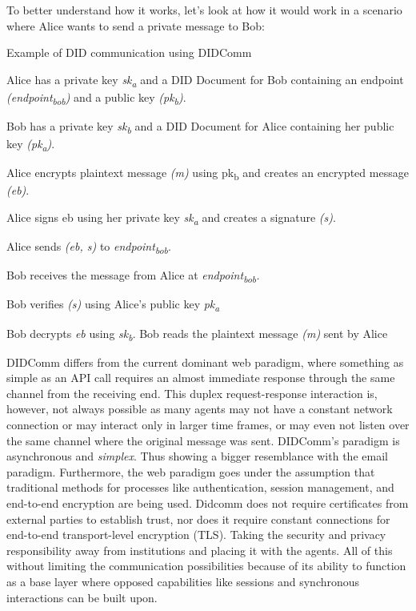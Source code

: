 To better understand how it works, let's look at how it would work in a scenario where Alice wants to send a private message to Bob: 

\begin{algorithm}[H]
\caption{Example of DID communication using DIDComm \cite{Abramson_2020}}
\label{alg:didcomm_example}
  \begin{algorithmic}[1]
    \State Alice has a private key \emph{sk\textsubscript{a}} and a DID Document for Bob containing an endpoint \emph{(endpoint\textsubscript{bob})} and a public key \emph{(pk\textsubscript{b})}.

    \State Bob has a private key \emph{sk\textsubscript{b}} and a DID Document for Alice containing her public key \emph{(pk\textsubscript{a})}.

    \State Alice encrypts plaintext message \emph{(m)} using pk\textsubscript{b} and creates an encrypted message \emph{(eb)}.

    \State Alice signs eb using her private key \emph{sk\textsubscript{a}} and creates a signature \emph{(s)}.

    \State Alice sends \emph{(eb, s)} to \emph{endpoint\textsubscript{bob}}.

    \State Bob receives the message from Alice at \emph{{endpoint\textsubscript{bob}}.}

    \State Bob verifies \emph{(s)} using Alice's public key \emph{pk\textsubscript{a}}

    \State Bob decrypts \emph{eb} using \emph{sk\textsubscript{b}}.
    \State Bob reads the plaintext message \emph{(m)} sent by Alice
    \EndIf
  \end{algorithmic}
\end{algorithm}



DIDComm differs from the current dominant web paradigm, where something as simple as an API call requires an almost immediate response through the same channel from the receiving end. This duplex request-response interaction is, however, not always possible as many agents may not have a constant network connection or may interact only in larger time frames, or may even not listen over the same channel where the original message was sent. DIDComm's paradigm is asynchronous and \emph{simplex}. Thus showing a bigger resemblance with the email paradigm. Furthermore, the web paradigm goes under the assumption that traditional methods for processes like authentication, session management, and end-to-end encryption are being used. Didcomm does not require certificates from external parties to establish trust, nor does it require constant connections for end-to-end transport-level encryption (TLS). Taking the security and privacy responsibility away from institutions and placing it with the agents. All of this without limiting the communication possibilities because of its ability to function as a base layer where opposed capabilities like sessions and synchronous interactions can be built upon. \cite{curren_looker_terbu_2020}

